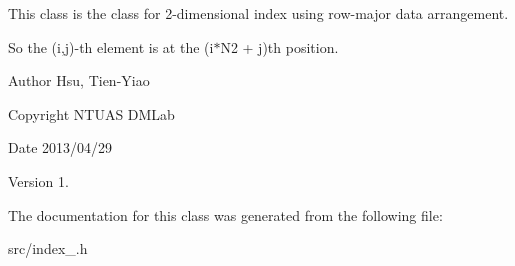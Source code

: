 This class is the class for 2-\/dimensional index using row-\/major data arrangement.\par
 So the (i,j)-\/th element is at the (i$\ast$\-N2 + j)th position. 

\begin{DoxyAuthor}{Author}
Hsu, Tien-\/\-Yiao 
\end{DoxyAuthor}
\begin{DoxyCopyright}{Copyright}
N\-T\-U\-A\-S D\-M\-Lab 
\end{DoxyCopyright}
\begin{DoxyDate}{Date}
2013/04/29 
\end{DoxyDate}
\begin{DoxyVersion}{Version}
1. 
\end{DoxyVersion}


The documentation for this class was generated from the following file\-:\begin{DoxyCompactItemize}
\item 
src/index\-\_.\-h\end{DoxyCompactItemize}
